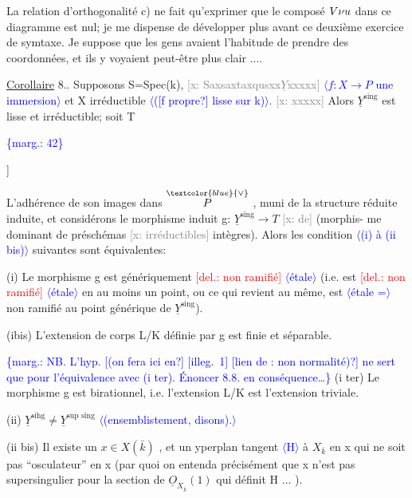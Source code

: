 \documentclass[11pt]{article}
\newcommand{\scanpage}[1]{\par\bigskip\noindent{\small\sffamily[scan #1]}\par}
\newcommand{\mspage}[1]{{\small\sffamily[p.\,#1]}}
\newcommand{\hand}[1]{\textcolor{blue}{#1}}
\let\over\relax
\newcommand{\over}[2]{\textcolor{gray}{#1}\textcolor{blue}{\ensuremath{^{\!\nearrow}}#2}}
\newcommand{\inserted}[2][]{\textcolor{blue}{$\langle$#2$\rangle$}}
\newcommand{\margin}[1]{\textcolor{blue}{\{\textsf{marg.:} #1\}}}
\newcommand{\deleted}[1]{\textcolor{red}{[\textsf{del.:} #1]}}
\newcommand{\xout}[1]{\textcolor{gray}{[\textsf{x:} #1]}}
\newcommand{\uline}[1]{\underline{#1}}
\newcommand{\unsure}[1]{[#1?]}
\newcommand{\illegible}[1]{[\textsf{illeg.\ #1}]}
\begin{document}
La relation d'orthogonalité c) ne fait qu'exprimer que le composé
$\over{V}{\nu}u$ dans ce diagramme est nul; je me dispense de développer plus
avant ce deuxième exercice de symtaxe. Je suppose que les gens avaient
l'habitude de prendre des coordonnées, et ils y voyaient peut-être plus
clair ....

\uline{Corollaire} 8.\over{\illegible{1}}{8}. Supposons S=Spec(k), \xout{Saxsaxtaxqusxx$\underline{Y}$xxxxx} \inserted{$f : X \to P$ une immersion} et X
irréductible \inserted{(\unsure{f propre} lisse sur k)}. \xout{xxxxx} Alors $\underline{Y}^{\mathrm{sing}}$ est lisse et irréductible; soit T

\margin{42}

\clearpage
\scanpage{25/43}
\mspage{\unsure{39}}

L'adhérence de son images dans $\overset{\hand{\vee}}{P}$ , muni de la structure réduite
induite, et considérons le morphisme induit g: $\underline{Y}^{\text{sing}} \longrightarrow T$ \xout{de} (morphis-%
me dominant de préschémas \xout{irréductibles} intègres). Alors les condition
\inserted[typed]{(i) à (ii bis)} suivantes sont équivalentes:

(i) Le morphisme g est génériquement \deleted{non ramifié} \inserted{étale} (i.e. est \deleted{non
ramifié} \inserted{étale} en au moins un point, ou ce qui revient au même, est \inserted{étale =} non ramifié
au point générique de $\underline{Y}^{\text{sing}}$).

(ibis) L'extension de corps L/K définie par g est finie et
séparable.

\margin{NB. L'hyp. \unsure{(on fera ici en} \illegible{1} \unsure{lien de : non normalité)} ne sert que pour l'équivalence avec (i ter). Énoncer 8.8. en conséquence\dots}
(i ter) Le morphisme g est birationnel, i.e. l'extension L/K est
l'extension triviale.

(ii) $\underline{Y}^{\text{sihg}} \neq \underline{Y}^{\text{sup sing}}$ \inserted{(ensemblistement, disons).}

(ii bis) Il existe un $x \in X(\bar{k})$ , et un \over{h}{h}yperplan tangent \inserted{H} à $X_{\bar{k}}$
en x qui ne soit pas ``osculateur'' en x (par quoi on entenda précisément
que x n'est pas supersingulier pour la section de $\underline{O}_{X_{\bar{k}}}(1)$ qui définit
H ... ).
\end{document}

